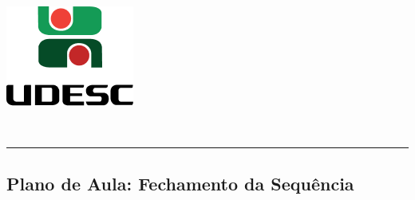 \thispagestyle{empty}
\begin{center}
	\begin{minipage}[!]{\linewidth}
		\begin{minipage}[!]{.19\linewidth}
			\includegraphics[width=\linewidth]{assets/logo.png}
		\end{minipage}
		\begin{minipage}[!]{.8\linewidth}
			\center
			\ABNTEXchapterfont\normalsize\MakeUppercase{\imprimirinstituicao}
			\par
			\vspace*{10pt}                     
			\ABNTEXchapterfont\normalsize\MakeUppercase{\centro}
			\par
			\vspace*{10pt}           
			\ABNTEXchapterfont\normalsize\MakeUppercase{\disciplina}
		\end{minipage}        
	\end{minipage}
	\\ \vspace{0.5cm}
	\rule{\textwidth}{.5pt}   
\end{center}
\textual
\begin{center}
	\section{Plano de Aula: Fechamento da Sequência} %
	\label{sec:Plano de Aula: Fechamento da Sequência}
\end{center}
